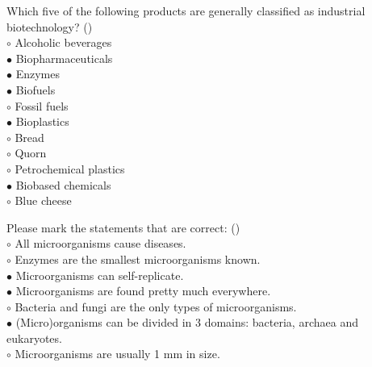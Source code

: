 \documentclass[]{beamer}
\begin{document}
\begin{CJK}{UTF8}{gbsn}
\begin{frame}[shrink] {} 
\addtocounter{answers}{1}
\color{blue}
  Which five of the following products are generally classified as industrial biotechnology?
 ({})\\
\color{black}
\setlength{\parindent}{-0.4cm}
{\color{red}$\circ$} Alcoholic beverages  \\
{\color{red}$\bullet$} Biopharmaceuticals  \\
{\color{red}$\bullet$} Enzymes   \\
{\color{red}$\bullet$} Biofuels  \\
{\color{red}$\circ$} Fossil fuels  \\
{\color{red}$\bullet$} Bioplastics  \\
{\color{red}$\circ$} Bread  \\
{\color{red}$\circ$} Quorn  \\
{\color{red}$\circ$} Petrochemical plastics  \\
{\color{red}$\bullet$} Biobased chemicals  \\
{\color{red}$\circ$} Blue cheese  \\
\end{frame}


\begin{frame}[shrink] {} 
\addtocounter{answers}{1}
\color{blue}
  Please mark the statements that are correct: 
 ({})\\
\color{black}
\setlength{\parindent}{-0.4cm}
{\color{red}$\circ$} All microorganisms cause diseases.  \\
{\color{red}$\circ$} Enzymes are the smallest microorganisms known.   \\
{\color{red}$\bullet$} Microorganisms can self-replicate.  \\
{\color{red}$\bullet$} Microorganisms are found pretty much everywhere.  \\
{\color{red}$\circ$} Bacteria and fungi are the only types of microorganisms.  \\
{\color{red}$\bullet$} (Micro)organisms can be divided in 3 domains: bacteria, archaea and eukaryotes.  \\
{\color{red}$\circ$} Microorganisms are usually 1 mm in size.  \\
\end{frame}



\end{CJK}
\end{document}
